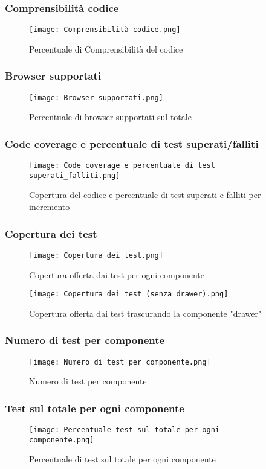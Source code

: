     \subsubsection{Comprensibilità codice}
    \begin{figure}[H]
      \centering
      \texttt{[image: Comprensibilità codice.png]}
      \caption{Percentuale di Comprensibilità del codice}
    \end{figure}

    \subsubsection{Browser supportati}
    \begin{figure}[H]
      \centering
      \texttt{[image: Browser supportati.png]}
      \caption{Percentuale di browser supportati sul totale}
    \end{figure}

    \subsubsection{Code coverage e percentuale di test superati/falliti}
    \begin{figure}[H]
      \centering
      \texttt{[image: Code coverage e percentuale di test superati\_falliti.png]}
      \caption{Copertura del codice e percentuale di test superati e falliti per incremento}
    \end{figure}

    \subsubsection{Copertura dei test}
    \begin{figure}[H]
      \centering
      \texttt{[image: Copertura dei test.png]}
      \caption{Copertura offerta dai test per ogni componente}
    \end{figure}

    \begin{figure}[H]
      \centering
      \texttt{[image: Copertura dei test (senza drawer).png]}
      \caption{Copertura offerta dai test trascurando la componente "drawer"}
    \end{figure}

    \subsubsection{Numero di test per componente}
    \begin{figure}[H]
      \centering
      \texttt{[image: Numero di test per componente.png]}
      \caption{Numero di test per componente}
    \end{figure}

    \subsubsection{Test sul totale per ogni componente}
    \begin{figure}[H]
      \centering
      \texttt{[image: Percentuale test sul totale per ogni componente.png]}
      \caption{Percentuale di test sul totale per ogni componente}
    \end{figure}
